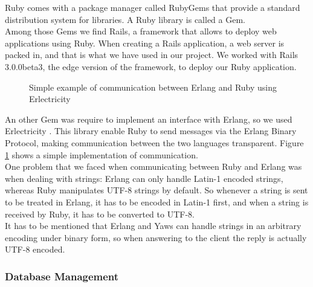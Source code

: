 Ruby comes with a package manager called RubyGems that provide a standard distribution system for libraries. A Ruby library is called a Gem.\\

Among those Gems we find Rails, a framework that allows to deploy web applications using Ruby. When creating a Rails application, a web server is packed in, and that is what we have used in our project. We worked with Rails 3.0.0beta3, the edge version of the framework, to deploy our Ruby application.\\

\begin{figure}[ht]
\centering
{}

\caption{Simple example of communication between Erlang and Ruby using Erlectricity }
\label{fig:erlectricity_example}
\end{figure}

An other Gem was require to implement an interface with Erlang, so we used Erlectricity \cite{Fle09}. This library enable Ruby to send messages via the Erlang Binary Protocol, making communication between the two languages transparent. Figure \ref{fig:erlectricity_example} shows a simple implementation of communication.\\

One problem that we faced when communicating between Ruby and Erlang was when dealing with strings: Erlang can only handle Latin-1 encoded strings, whereas Ruby manipulates UTF-8 strings by default. So whenever a string is sent to be treated in Erlang, it has to be encoded in Latin-1 first, and when a string is received by Ruby, it has to be converted to UTF-8.\\

It has to be mentioned that Erlang and Yaws can handle strings in an arbitrary encoding under binary form, so when answering to the client the reply is actually UTF-8 encoded.

\subsubsection{Database Management}

